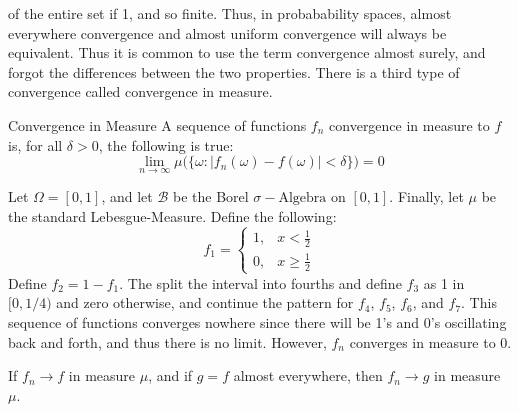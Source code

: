             of the entire set if 1, and so finite. Thus, in
            probabability spaces, almost everywhere convergence
            and almost uniform convergence will always be
            equivalent. Thus it is common to use the term
            convergence almost surely, and forgot the differences
            between the two properties. There is a third type of
            convergence called convergence in measure.
            \begin{ldefinition}{Convergence in Measure}
                A sequence of functions $f_{n}$ convergence
                in measure to $f$ is, for all $\delta>0$, the
                following is true:
                \begin{equation}
                    \underset{n\rightarrow\infty}{\lim}
                    \mu\Big(
                        \big\{
                            \omega:|f_{n}(\omega)-f(\omega)|
                            <\delta
                        \big\}
                    \Big)=0
                \end{equation}
            \end{ldefinition}
            \begin{example}
                Let $\Omega=[0,1]$, and let $\mathcal{B}$ be
                the Borel $\sigma-\textrm{Algebra}$ on
                $[0,1]$. Finally, let $\mu$ be the standard
                Lebesgue-Measure. Define the following:
                \begin{equation}
                    f_{1}=
                    \begin{cases}
                        1,&x<\frac{1}{2}\\
                        0,&x\geq\frac{1}{2}
                    \end{cases}
                \end{equation}
                Define $f_{2}=1-f_{1}$. The split the
                interval into fourths and define
                $f_{3}$ as 1 in $[0,1/4)$ and zero otherwise,
                and continue the pattern for $f_{4}$, $f_{5}$,
                $f_{6}$, and $f_{7}$. This sequence of functions
                converges nowhere since there will be 1's and
                0's oscillating back and forth, and thus there
                is no limit. However, $f_{n}$ converges in
                measure to 0.
            \end{example}
            \begin{theorem}
                If $f_{n}\rightarrow{f}$ in measure $\mu$,
                and if $g=f$ almost everywhere, then
                $f_{n}\rightarrow{g}$ in measure $\mu$.
            \end{theorem}
